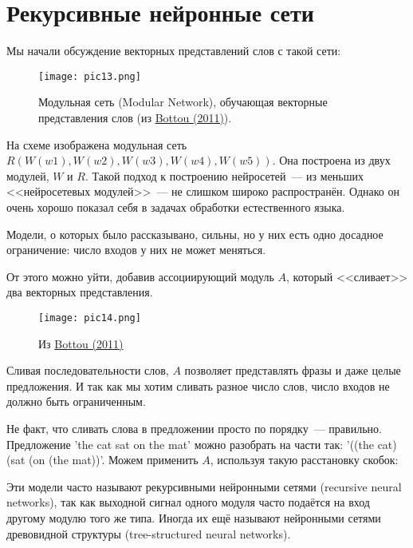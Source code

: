 \documentclass[a4paper,12pt]{article}
\begin{document}
\section*{Рекурсивные нейронные сети}

Мы начали обсуждение векторных представлений слов с такой сети:

\begin{figure}[t]
\begin{center}
\texttt{[image: pic13.png]}
\caption{Модульная сеть (Modular Network), обучающая векторные представления слов (из \href{http://arxiv.org/pdf/1102.1808v3.pdf}{Bottou (2011)}).}
\end{center}
\end{figure}

На схеме изображена модульная сеть $R(W(w1), W(w2), W(w3), W(w4), W(w5))$. Она построена из двух модулей, $W$ и $R$. Такой подход к построению нейросетей~--- из меньших <<нейросетевых модулей>>~--- не слишком широко распространён. Однако он очень хорошо показал себя в задачах обработки естественного языка.


Модели, о которых было рассказывано, сильны, но у них есть одно досадное ограничение: число входов у них не может меняться.

От этого можно уйти, добавив ассоциирующий модуль $A$, который  <<сливает>> два векторных представления.


\begin{figure}[t]
\begin{center}
\texttt{[image: pic14.png]}
\caption{Из \href{http://arxiv.org/pdf/1102.1808v3.pdf}{Bottou (2011)}}
\end{center}
\end{figure}

Сливая последовательности слов, $A$ позволяет представлять фразы и даже целые предложения. И так как мы хотим сливать разное число слов, число входов не должно быть ограниченным.


Не факт, что сливать слова в предложении просто по порядку~--- правильно. Предложение 'the cat sat on the mat' можно разобрать на части так: '((the cat) (sat (on (the mat))'. Можем применить $A$, используя такую расстановку скобок:


Эти модели часто называют рекурсивными нейронными сетями (recursive neural networks), так как выходной сигнал одного модуля часто подаётся на вход другому модулю того же типа. Иногда их ещё называют нейронными сетями древовидной структуры (tree-structured neural networks).
\end{document}
